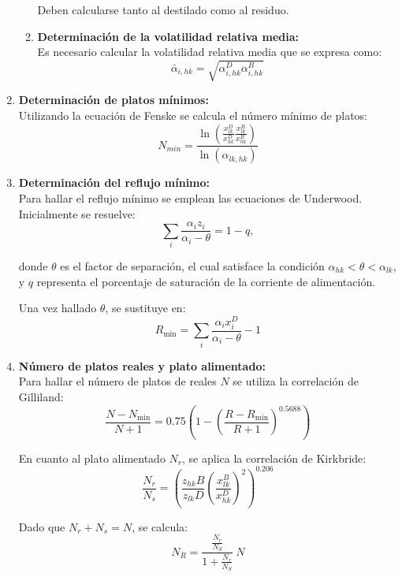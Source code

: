 \begin{enumerate}
\begin{enumerate}
                    Deben calcularse tanto al destilado como al residuo.

              \item \textbf{Determinación de la volatilidad relativa media:}\\
                    Es necesario calcular la volatilidad relativa media que se expresa como:
                    $$
                        \bar{\alpha}_{i, hk} = \sqrt{\alpha_{i, hk}^{D} \alpha_{i, hk}^{B}}
                    $$
          \end{enumerate}

    \item \textbf{Determinación de platos mínimos:}\\
          Utilizando la ecuación de Fenske se calcula el número mínimo de platos:
          $$
              N_{min} = \frac{\ln\left(\frac{x_{lk}^D}{x_{hk}^D}\frac{x_{lk}^B}{x_{hk}^B}\right)}{\ln\left(\alpha_{lk,hk}\right)}
          $$

    \item \textbf{Determinación del reflujo mínimo:}\\
          Para hallar el reflujo mínimo se emplean las ecuaciones de Underwood. Inicialmente se resuelve:
          $$
              \sum_i \frac{\alpha_{i} z_{i}}{\alpha_{i} - \theta} = 1 - q,
          $$

          donde $\theta$ es el factor de separación, el cual satisface la condición $\alpha_{hk} < \theta < \alpha_{lk}$, y $q$ representa el porcentaje de saturación de la corriente de alimentación.

          Una vez hallado $\theta$, se sustituye en:
          $$
              R_{\text{min}} = \sum_i \frac{\alpha_{i} x_{i}^{D}}{\alpha_{i} - \theta} - 1
          $$

    \item \textbf{Número de platos reales y plato alimentado:}\\
          Para hallar el número de platos de reales $N$ se utiliza la correlación de Gilliland:
          $$
              \frac{N - N_{\text{min}}}{N + 1} = 0.75 \left(1- \left(\frac{R - R_{\text{min}}}{R + 1}\right)^{0.5688}\right)
          $$

          En cuanto al plato alimentado $N_r$, se aplica la correlación de Kirkbride:
          $$
              \frac{N_r}{N_s} = \left(\frac{z_{hk}B}{z_{lk}D}\left(\frac{x_{lk}^B}{x_{hk}^D}\right)^2\right)^{0.206}
          $$

          Dado que $N_r + N_s = N$, se calcula:
          $$
              N_R = \frac{\frac{N_r}{N_S}}{1 + \frac{N_r}{N_S}} \  N
          $$
\end{enumerate}


